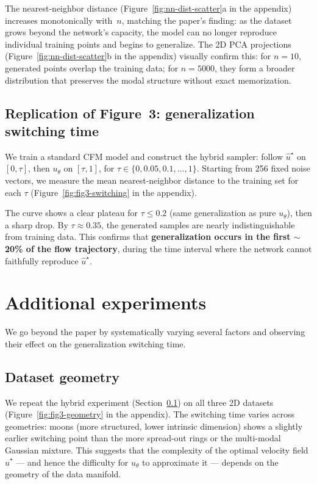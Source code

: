 \documentclass[10pt,a4paper]{article}
\theoremstyle{definition}
\begin{document}
The nearest-neighbor distance (Figure~\ref{fig:nn-dist-scatter}a in the appendix) increases monotonically with~$n$, matching the paper's finding: as the dataset grows beyond the network's capacity, the model can no longer reproduce individual training points and begins to generalize.
The 2D PCA projections (Figure~\ref{fig:nn-dist-scatter}b in the appendix) visually confirm this: for $n = 10$, generated points overlap the training data; for $n = 5000$, they form a broader distribution that preserves the modal structure without exact memorization.

\subsection{Replication of Figure~3: generalization switching time}\label{subsec:fig3}

We train a standard CFM model and construct the hybrid sampler: follow $\hat{u}^\star$ on $[0, \tau]$, then $u_\theta$ on $[\tau, 1]$, for $\tau \in \{0, 0.05, 0.1, \ldots, 1\}$.
Starting from 256 fixed noise vectors, we measure the mean nearest-neighbor distance to the training set for each $\tau$ (Figure~\ref{fig:fig3-switching} in the appendix).

The curve shows a clear plateau for $\tau \leq 0.2$ (same generalization as pure $u_\theta$), then a sharp drop.
By $\tau \approx 0.35$, the generated samples are nearly indistinguishable from training data.
This confirms that \textbf{generalization occurs in the first $\sim$20\% of the flow trajectory}, during the time interval where the network cannot faithfully reproduce $\hat{u}^\star$.

\section{Additional experiments}\label{sec:additional}

We go beyond the paper by systematically varying several factors and observing their effect on the generalization switching time.

\subsection{Dataset geometry}

We repeat the hybrid experiment (Section~\ref{subsec:fig3}) on all three 2D datasets (Figure~\ref{fig:fig3-geometry} in the appendix).
The switching time varies across geometries: moons (more structured, lower intrinsic dimension) shows a slightly earlier switching point than the more spread-out rings or the multi-modal Gaussian mixture.
This suggests that the complexity of the optimal velocity field $\hat{u}^\star$ --- and hence the difficulty for $u_\theta$ to approximate it --- depends on the geometry of the data manifold.
\end{document}
